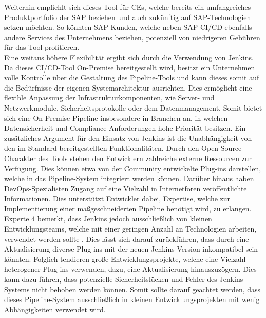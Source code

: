 Weiterhin empfiehlt sich dieses Tool für CEs, welche bereits ein umfangreiches Produktportfolio der SAP beziehen und auch zukünftig auf SAP-Technologien setzen möchten. So könnten SAP-Kunden, welche neben SAP CI/CD ebenfalls andere Services des Unternehmens beziehen, potenziell von niedrigeren Gebühren für das Tool profitieren.\\ Eine weitaus höhere Flexibilität ergibt sich durch die Verwendung von Jenkins. Da dieses CI/CD-Tool On-Premise bereitgestellt wird, besitzt ein Unternehmen volle Kontrolle über die Gestaltung des Pipeline-Tools und kann dieses somit auf die Bedürfnisse der eigenen Systemarchitektur ausrichten. Dies ermöglicht eine flexible Anpassung der Infrastrukturkomponenten, wie Server- und Netzwerkmodule, Sicherheitsprotokolle oder dem Datenmanagement. Somit bietet sich eine On-Premise-Pipeline insbesondere in Branchen an, in welchen Datensicherheit und Compliance-Anforderungen hohe Priorität besitzen. Ein zusätzliches Argument für den Einsatz von Jenkins ist die Unabhängigkeit von den im Standard bereitgestellten Funktionalitäten. Durch den Open-Source-Charakter des Tools stehen den Entwicklern zahlreiche externe Ressourcen zur Verfügung. Dies können etwa von der Community entwickelte Plug-ins darstellen, welche in das Pipeline-System integriert werden können. Darüber hinaus haben DevOps-Spezialisten Zugang auf eine Vielzahl in Internetforen veröffentlichte Informationen. Dies unterstützt Entwickler dabei, Expertise, welche zur Implementierung einer maßgeschneiderten Pipeline benötigt wird, zu erlangen. Experte 4 bemerkt, dass Jenkins jedoch ausschließlich von kleinen Entwicklungsteams, welche mit einer geringen Anzahl an Technologien arbeiten, verwendet werden sollte \cite[Z. 58 ff.]{TestDeveloperSAPHyperspaceAdoption&Onboarding.}. Dies lässt sich darauf zurückführen, dass durch eine Aktualisierung diverse Plug-ins mit der neuen Jenkins-Version inkompatibel sein könnten. Folglich tendieren große Entwicklungsprojekte, welche eine Vielzahl heterogener Plug-ins verwenden, dazu, eine Aktualisierung hinauszuzögern. Dies kann dazu führen, dass potenzielle Sicherheitslücken und Fehler des Jenkins-Systems nicht behoben werden können. Somit sollte darauf geachtet werden, dass dieses Pipeline-System ausschließlich in kleinen Entwicklungsprojekten mit wenig Abhängigkeiten verwendet wird.  
